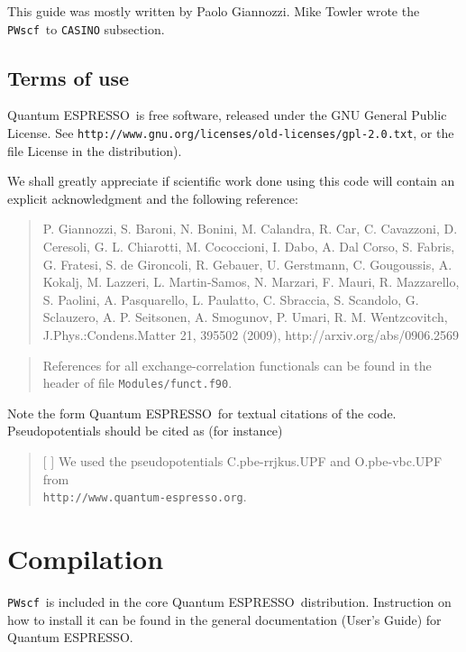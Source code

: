 \documentclass[12pt,a4paper]{article}
\def\PWscf{\texttt{PWscf}}
\def\qe{{\sc Quantum ESPRESSO}}
\begin{document}


This guide was mostly written by Paolo Giannozzi.
Mike Towler wrote the \PWscf\ to \texttt{CASINO} subsection.

 \subsection{Terms of use}

\qe\ is free software, released under the 
GNU General Public License. See
\texttt{http://www.gnu.org/licenses/old-licenses/gpl-2.0.txt}, 
or the file License in the distribution).
    
We shall greatly appreciate if scientific work done using this code will 
contain an explicit acknowledgment and the following reference:
\begin{quote}
P. Giannozzi, S. Baroni, N. Bonini, M. Calandra, R. Car, C. Cavazzoni,
D. Ceresoli, G. L. Chiarotti, M. Cococcioni, I. Dabo, A. Dal Corso,
S. Fabris, G. Fratesi, S. de Gironcoli, R. Gebauer, U. Gerstmann,
C. Gougoussis, A. Kokalj, M. Lazzeri, L. Martin-Samos, N. Marzari,
F. Mauri, R. Mazzarello, S. Paolini, A. Pasquarello, L. Paulatto,
C. Sbraccia, S. Scandolo, G. Sclauzero, A. P. Seitsonen, A. Smogunov,
P. Umari, R. M. Wentzcovitch, J.Phys.:Condens.Matter 21, 395502 (2009),
http://arxiv.org/abs/0906.2569
\end{quote}
\begin{quote}
References for all exchange-correlation functionals can be found in the header
of file \texttt{Modules/funct.f90}.
\end{quote}
Note the form \qe\ for textual citations of the code.
Pseudopotentials should be cited as (for instance)
\begin{quote}
[ ] We used the pseudopotentials C.pbe-rrjkus.UPF
and O.pbe-vbc.UPF from\\
\texttt{http://www.quantum-espresso.org}.
\end{quote}

\section{Compilation}

\PWscf\ is included in the core \qe\ distribution.
Instruction on how to install it can be found in the
general documentation (User's Guide) for \qe.
\end{document}
